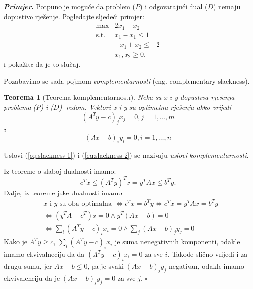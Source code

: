 \documentclass[a4paper, utf8, 11pt, colorlinks]{book}
\newtheorem{thm}{Teorema}
\newenvironment{proof}{{Dokaz:}}{\hfill$\square$}
\begin{document}
\emph{\textbf{Primjer.}} Potpuno je moguće da problem ($P$) i odgovarajući dual ($D$) nemaju dopustivo rješenje. Pogledajte sljedeći primjer:
$$\begin{array}{cc}
    \max                      & 2 x_1 - x_2 \\
     \mbox{s.t. }      & x_1 - x_1 \leq 1 \\
                              & -x_1 + x_2 \leq -2 \\
                             & x_1, x_2 \geq 0.
\end{array}$$
i pokažite da je to slučaj.

Pozabavimo se sada pojmom \emph{komplementarnosti} (eng. complementary slackness). 
\begin{thm}[Teorema komplementarnosti]
      Neka su x i y dopustiva rješenja problema ($P$) i  ($D$), redom. Vektori x i y su optimalna rješenja akko vrijedi 
      \begin{equation}\label{eq:slackness-1}
           (A^Ty - c)_j x_j = 0, j=1,\ldots,m
      \end{equation} i
      \begin{equation}\label{eq:slackness-2}
           (Ax - b)_i y_i = 0, i=1,\ldots,n
      \end{equation}
\end{thm}
Uslovi (\ref{eq:slackness-1}) i (\ref{eq:slackness-2}) se nazivaju \emph{uslovi komplementarnosti}.

\begin{proof}
         Iz teoreme o slaboj dualnosti imamo: 
         \begin{equation}
             c^Tx \leq ( A^T y)^T x = y^T A x \leq b^T y. 
         \end{equation}
         Dalje, iz teoreme jake dualnosti imamo  
         \begin{align*}
             &x \mbox{ i } y \mbox{ su oba optimalna } \Longleftrightarrow c^T x = b^T y \Longleftrightarrow c^Tx = y^TA x = b^Ty \\
             &\Longleftrightarrow (y^T A - c^T) x = 0 \wedge y^T(Ax - b )  = 0\\
             & \Longleftrightarrow \sum_i (A^T y - c)_i x_i = 0 \wedge \sum_j (Ax - b)_j y_j = 0
         \end{align*}
         Kako je $A^Ty \geq c$, $\sum_i (A^T y - c)_i x_i$ je suma nenegativnih komponenti, odakle imamo ekvivalneciju da  da   $(A^T y - c)_i x_i= 0$ za sve $i$. Takođe slično vrijedi i za drugu sumu, jer $Ax - b \leq 0$, pa je svaki  $(Ax - b)_j y_j$ negativan, odakle imamo ekvivalenciju da je $(Ax - b)_j y_j = 0$ za sve $j$.
\end{proof}
\end{document}
